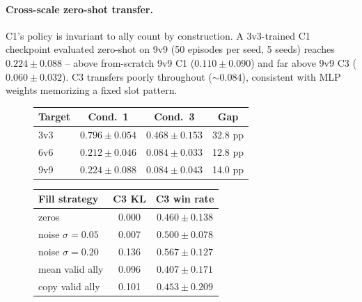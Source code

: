 \documentclass{nextgame2026}
\begin{document}
\paragraph{Cross-scale zero-shot transfer.} C1's policy is invariant to ally count by construction. A 3v3-trained C1 checkpoint evaluated zero-shot on 9v9 (50 episodes per seed, 5 seeds) reaches $0.224\pm 0.088$ -- above from-scratch 9v9 C1 ($0.110\pm 0.090$) and far above 9v9 C3 ($0.060\pm 0.032$). C3 transfers poorly throughout ($\sim 0.084$), consistent with MLP weights memorizing a fixed slot pattern.

\begin{figure}[t]
\centering
\begin{minipage}[t]{0.47\linewidth}
  \vspace{0pt}
  \centering\small
  \setlength{\tabcolsep}{5pt}
  \label{tab:transfer}
  \begin{tabular}{lccc}
  \toprule
  Target & Cond.~1 & Cond.~3 & Gap \\
  \midrule
  3v3 & $\mathbf{0.796{\pm}0.054}$ & $0.468{\pm}0.153$ & 32.8 pp \\
  6v6 & $\mathbf{0.212{\pm}0.046}$ & $0.084{\pm}0.033$ & 12.8 pp \\
  9v9 & $\mathbf{0.224{\pm}0.088}$ & $0.084{\pm}0.043$ & 14.0 pp \\
  \bottomrule
  \end{tabular}
\end{minipage}
\hfill
\begin{minipage}[t]{0.49\linewidth}
  \vspace{0pt}
  \centering\small
  \setlength{\tabcolsep}{5pt}
  \label{tab:padding}
  \begin{tabular}{lcc}
  \toprule
  Fill strategy & C3 KL & C3 win rate \\
  \midrule
  zeros & 0.000 & $0.460{\pm}0.138$ \\
  noise $\sigma{=}0.05$ & 0.007 & $0.500{\pm}0.078$ \\
  noise $\sigma{=}0.20$ & 0.136 & $\mathbf{0.567{\pm}0.127}$ \\
  mean valid ally & 0.096 & $0.407{\pm}0.171$ \\
  copy valid ally & 0.101 & $0.453{\pm}0.209$ \\
  \bottomrule
  \end{tabular}
\end{minipage}
\end{figure}
\end{document}
